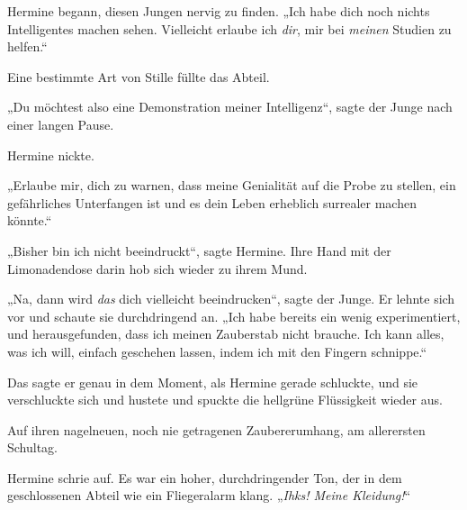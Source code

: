 Hermine begann, diesen Jungen nervig zu finden. „Ich habe dich noch nichts Intelligentes machen sehen. Vielleicht erlaube ich \emph{dir}, mir bei \emph{meinen} Studien zu helfen.“

Eine bestimmte Art von Stille füllte das Abteil.

„Du möchtest also eine Demonstration meiner Intelligenz“, sagte der Junge nach einer langen Pause.

Hermine nickte.

„Erlaube mir, dich zu warnen, dass meine Genialität auf die Probe zu stellen, ein gefährliches Unterfangen ist und es dein Leben erheblich surrealer machen könnte.“

„Bisher bin ich nicht beeindruckt“, sagte Hermine. Ihre Hand mit der Limonadendose darin hob sich wieder zu ihrem Mund.

„Na, dann wird \emph{das} dich vielleicht beeindrucken“, sagte der Junge. Er lehnte sich vor und schaute sie durchdringend an. „Ich habe bereits ein wenig experimentiert, und herausgefunden, dass ich meinen Zauberstab nicht brauche. Ich kann alles, was ich will, einfach geschehen lassen, indem ich mit den Fingern schnippe.“

Das sagte er genau in dem Moment, als Hermine gerade schluckte, und sie verschluckte sich und hustete und spuckte die hellgrüne Flüssigkeit wieder aus.

Auf ihren nagelneuen, noch nie getragenen Zaubererumhang, am allerersten Schultag.

Hermine schrie auf. Es war ein hoher, durchdringender Ton, der in dem geschlossenen Abteil wie ein Fliegeralarm klang. „\emph{Ihks! Meine Kleidung!}“


